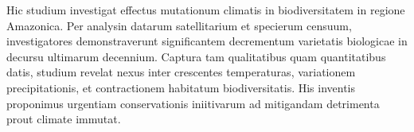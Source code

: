 Hic studium investigat effectus mutationum climatis in biodiversitatem in regione Amazonica. Per analysin datarum satellitarium et specierum censuum, investigatores demonstraverunt significantem decrementum varietatis biologicae in decursu ultimarum decennium. Captura tam qualitatibus quam quantitatibus datis, studium revelat nexus inter crescentes temperaturas, variationem precipitationis, et contractionem habitatum biodiversitatis. His inventis proponimus urgentiam conservationis iniitivarum ad mitigandam detrimenta prout climate immutat.

